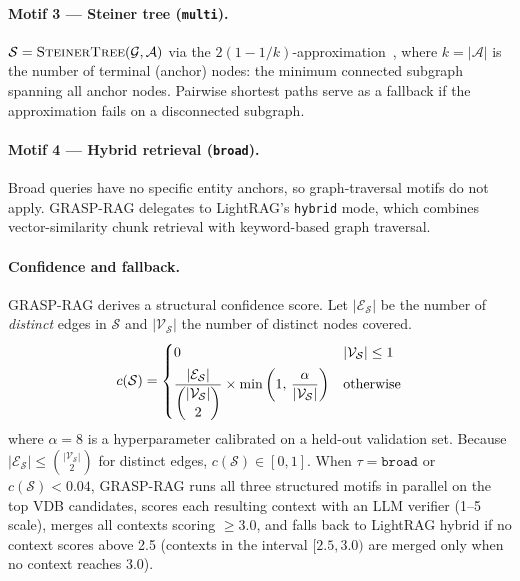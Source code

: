\paragraph{Motif 3 — Steiner tree (\texttt{multi}).}
$\mathcal{S} = \textsc{SteinerTree}(\mathcal{G}, \mathcal{A})$ via the
$2(1-1/k)$-approximation~\cite{kou1981fast}, where $k = |\mathcal{A}|$ is
the number of terminal (anchor) nodes: the minimum connected subgraph
spanning all anchor nodes.
Pairwise shortest paths serve as a fallback if the approximation fails on a
disconnected subgraph.

\paragraph{Motif 4 — Hybrid retrieval (\texttt{broad}).}
Broad queries have no specific entity anchors, so graph-traversal motifs do
not apply.
GRASP-RAG delegates to LightRAG's \texttt{hybrid} mode, which combines
vector-similarity chunk retrieval with keyword-based graph traversal.

\paragraph{Confidence and fallback.}
GRASP-RAG derives a structural confidence score. Let $|\mathcal{E}_\mathcal{S}|$
be the number of \emph{distinct} edges in $\mathcal{S}$ and
$|\mathcal{V}_\mathcal{S}|$ the number of distinct nodes covered.
\begin{equation}
  c(\mathcal{S}) = \begin{cases}
    0 & |\mathcal{V}_\mathcal{S}| \le 1 \\[4pt]
    \dfrac{|\mathcal{E}_\mathcal{S}|}{\dbinom{|\mathcal{V}_\mathcal{S}|}{2}}
      \times \min\left(1,\, \dfrac{\alpha}{|\mathcal{V}_\mathcal{S}|}\right)
    & \text{otherwise}
  \end{cases}
  \label{eq:conf}
\end{equation}
where $\alpha = 8$ is a hyperparameter calibrated on a held-out validation
set. Because $|\mathcal{E}_\mathcal{S}| \le \binom{|\mathcal{V}_\mathcal{S}|}{2}$
for distinct edges, $c(\mathcal{S}) \in [0, 1]$.
When $\tau = \texttt{broad}$ or $c(\mathcal{S}) < 0.04$, GRASP-RAG runs all
three structured motifs in parallel on the top VDB candidates, scores each
resulting context with an LLM verifier (1--5 scale), merges all contexts
scoring $\ge 3.0$, and falls back to LightRAG hybrid if no context scores
above 2.5 (contexts in the interval $[2.5, 3.0)$ are merged only when no
context reaches 3.0).

